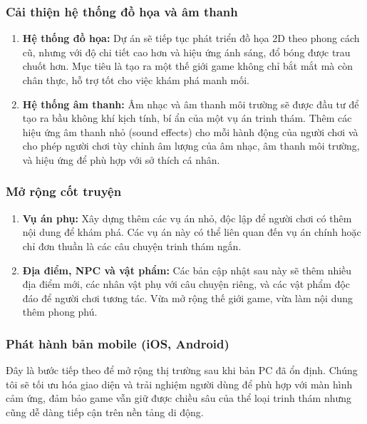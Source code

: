 \subsubsection{Cải thiện hệ thống đồ họa và âm thanh}
\begin{enumerate}
    \item \textbf{Hệ thống đồ họa:}
    Dự án sẽ tiếp tục phát triển đồ họa 2D theo phong cách cũ, nhưng với độ chi tiết cao hơn và hiệu ứng ánh sáng, đổ bóng được trau chuốt hơn. Mục tiêu là tạo ra một thế giới game không chỉ bắt mắt mà còn chân thực, hỗ trợ tốt cho việc khám phá manh mối.

    \item \textbf{Hệ thống âm thanh:}
    Âm nhạc và âm thanh môi trường sẽ được đầu tư để tạo ra bầu không khí kịch tính, bí ẩn của một vụ án trinh thám. Thêm các hiệu ứng âm thanh nhỏ (sound effects) cho mỗi hành động của người chơi và cho phép người chơi tùy chỉnh âm lượng của âm nhạc, âm thanh môi trường, và hiệu ứng để phù hợp với sở thích cá nhân.
\end{enumerate}

\subsubsection{Mở rộng cốt truyện}
\begin{enumerate}
    \item \textbf{Vụ án phụ:}
    Xây dựng thêm các vụ án nhỏ, độc lập để người chơi có thêm nội dung để khám phá. Các vụ án này có thể liên quan đến vụ án chính hoặc chỉ đơn thuần là các câu chuyện trinh thám ngắn.

    \item \textbf{Địa điểm, NPC và vật phẩm:}
    Các bản cập nhật sau này sẽ thêm nhiều địa điểm mới, các nhân vật phụ với câu chuyện riêng, và các vật phẩm độc đáo để người chơi tương tác. Vừa mở rộng thế giới game, vừa làm nội dung thêm phong phú.
\end{enumerate}

\subsubsection{Phát hành bản mobile (iOS, Android)}
Đây là bước tiếp theo để mở rộng thị trường sau khi bản PC đã ổn định. Chúng tôi sẽ tối ưu hóa giao diện và trải nghiệm người dùng để phù hợp với màn hình cảm ứng, đảm bảo game vẫn giữ được chiều sâu của thể loại trinh thám nhưng cũng dễ dàng tiếp cận trên nền tảng di động.